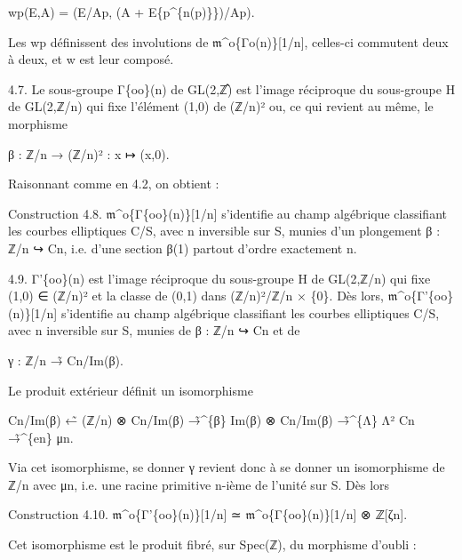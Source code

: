 \documentclass[11pt,a4paper]{article}
\begin{document}
w\textunderscore{}p(E,A) = (E/A\textunderscore{}p, (A + E\textunderscore{}\{p\textasciicircum{}\{n(p)\}\})/A\textunderscore{}p).

Les w\textunderscore{}p définissent des involutions de \ensuremath{\mathfrak{m}}\textasciicircum{}o\textunderscore{}\{Γ\textunderscore{}o(n)\}[1/n], celles-ci commutent deux à deux, et w est leur composé.

4.7. Le sous-groupe Γ\textunderscore{}\{oo\}(n) de GL(2,ℤ̂) est l'image réciproque du sous-groupe H de GL(2,ℤ/n) qui fixe l'élément (1,0) de (ℤ/n)² ou, ce qui revient au même, le morphisme

β : ℤ/n → (ℤ/n)² : x ↦ (x,0).

Raisonnant comme en 4.2, on obtient :

Construction 4.8. \ensuremath{\mathfrak{m}}\textasciicircum{}o\textunderscore{}\{Γ\textunderscore{}\{oo\}(n)\}[1/n] s'identifie au champ algébrique classifiant les courbes elliptiques C/S, avec n inversible sur S, munies d'un plongement β : ℤ/n ↪ C\textunderscore{}n, i.e. d'une section β(1) partout d'ordre exactement n.

4.9. Γ'\textunderscore{}\{oo\}(n) est l'image réciproque du sous-groupe H de GL(2,ℤ/n) qui fixe (1,0) ∈ (ℤ/n)² et la classe de (0,1) dans (ℤ/n)²/ℤ/n × \{0\}. Dès lors, \ensuremath{\mathfrak{m}}\textasciicircum{}o\textunderscore{}\{Γ'\textunderscore{}\{oo\}(n)\}[1/n] s'identifie au champ algébrique classifiant les courbes elliptiques C/S, avec n inversible sur S, munies de β : ℤ/n ↪ C\textunderscore{}n et de

γ : ℤ/n →̃ C\textunderscore{}n/Im(β).

Le produit extérieur définit un isomorphisme

C\textunderscore{}n/Im(β) ←̃ (ℤ/n) ⊗ C\textunderscore{}n/Im(β) →̃\textasciicircum{}\{β\} Im(β) ⊗ C\textunderscore{}n/Im(β) →̃\textasciicircum{}\{Λ\} Λ² C\textunderscore{}n →̃\textasciicircum{}\{e\textunderscore{}n\} μ\textunderscore{}n.

Via cet isomorphisme, se donner γ revient donc à se donner un isomorphisme de ℤ/n avec μ\textunderscore{}n, i.e. une racine primitive n-ième de l'unité sur S. Dès lors

Construction 4.10. \ensuremath{\mathfrak{m}}\textasciicircum{}o\textunderscore{}\{Γ'\textunderscore{}\{oo\}(n)\}[1/n] ≃ \ensuremath{\mathfrak{m}}\textasciicircum{}o\textunderscore{}\{Γ\textunderscore{}\{oo\}(n)\}[1/n] ⊗ ℤ[ζ\textunderscore{}n].

Cet isomorphisme est le produit fibré, sur Spec(ℤ), du morphisme d'oubli :
\end{document}

